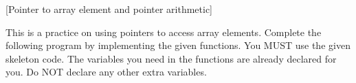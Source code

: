  [Pointer to array element and pointer arithmetic]

This is a practice on using pointers to access array elements.
Complete the following program by implementing the given functions.
You MUST use the given skeleton code.
The variables you need in the functions are already declared for you.
Do NOT declare any other extra variables.

